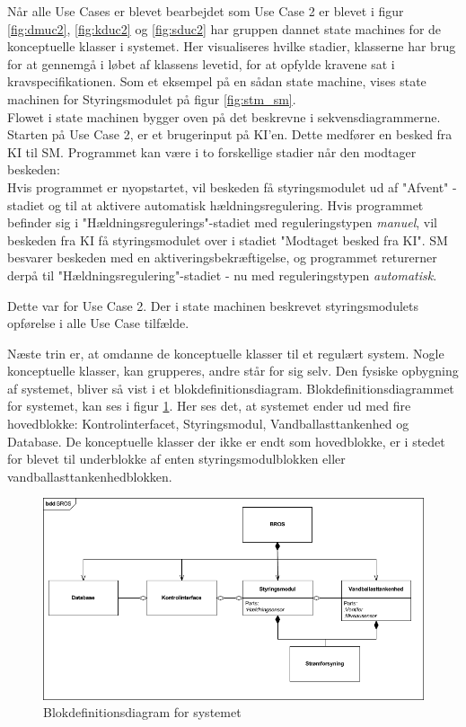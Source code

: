 Når alle Use Cases er blevet bearbejdet som Use Case 2 er blevet i figur \ref{fig:dmuc2}, \ref{fig:kduc2} og \ref{fig:sduc2} har gruppen dannet state machines for de konceptuelle klasser i systemet. Her visualiseres hvilke stadier, klasserne har brug for at gennemgå i løbet af klassens levetid, for at opfylde kravene sat i kravspecifikationen. Som et eksempel på en sådan state machine, vises state machinen for Styringsmodulet på figur \ref{fig:stm_sm}. \\Flowet i state machinen bygger oven på det beskrevne i sekvensdiagrammerne. Starten på Use Case 2, er et brugerinput på KI'en. Dette medfører en besked fra KI til SM. Programmet kan være i to forskellige stadier når den modtager beskeden:\\
Hvis programmet er nyopstartet, vil beskeden få styringsmodulet ud af "Afvent" -stadiet og til at aktivere automatisk hældningsregulering. Hvis programmet befinder sig i "Hældningsregulerings"-stadiet med reguleringstypen \textit{manuel}, vil beskeden fra KI få styringsmodulet over i stadiet "Modtaget besked fra KI". SM besvarer beskeden med en aktiveringsbekræftigelse, og programmet returerner derpå til "Hældningsregulering"-stadiet - nu med reguleringstypen \textit{automatisk}.

Dette var for Use Case 2. Der i state machinen beskrevet styringsmodulets opførelse i alle Use Case tilfælde. 

Næste trin er, at omdanne de konceptuelle klasser til et regulært system. Nogle konceptuelle klasser, kan grupperes, andre står for sig selv. Den fysiske opbygning af systemet, bliver så vist i et blokdefinitionsdiagram. Blokdefinitionsdiagrammet for 
systemet, kan ses i figur \ref{fig:bdd_bros}. Her ses det, at systemet ender ud med fire hovedblokke: Kontrolinterfacet, Styringsmodul, Vandballasttankenhed og Database. De konceptuelle klasser der ikke er endt som hovedblokke, er i stedet for blevet til underblokke af enten styringsmodulblokken eller vandballasttankenhedblokken.

\begin{figure}[htbp]
\centering
\includegraphics[scale=0.5]{billeder/Systemarkitektur/ny_bdd_bros}
\caption{Blokdefinitionsdiagram for systemet}
\label{fig:bdd_bros}
\end{figure}

